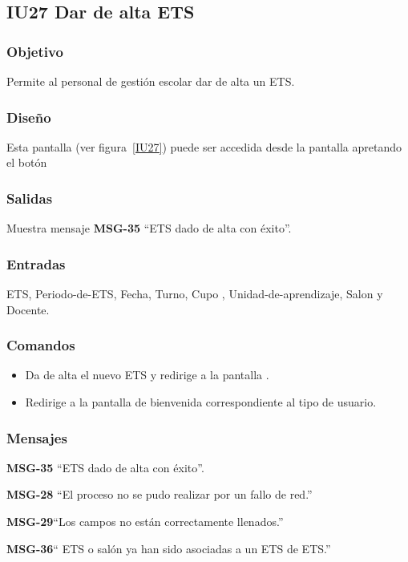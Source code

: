 
\subsection{IU27 Dar de alta ETS}
\subsubsection{Objetivo}
    Permite al personal de gestión escolar dar de alta un ETS.
\subsubsection{Diseño}
    Esta pantalla  (ver figura~\ref{IU27}) puede ser accedida desde la pantalla  apretando el botón 

\subsubsection{Salidas}
Muestra mensaje {\bf MSG-35} ``ETS  dado de alta con éxito''.
\subsubsection{Entradas}
ETS, Periodo-de-ETS, Fecha, Turno, Cupo , Unidad-de-aprendizaje,  Salon y Docente.
\subsubsection{Comandos}
\begin{itemize}
    \item {} Da de alta el nuevo ETS y redirige a la pantalla .
    \item {} Redirige a la pantalla de bienvenida correspondiente al tipo de usuario.
    
\end{itemize}

\subsubsection{Mensajes}

\begin{Citemize}
    \item {\bf MSG-35} ``ETS  dado de alta con éxito''.
    \item {\bf MSG-28}  ``El proceso no se pudo realizar por un fallo de red.''
    \item {\bf MSG-29}{``Los campos no están correctamente llenados.''}
    \item {\bf MSG-36}{`` ETS o salón  ya han sido asociadas a un ETS de ETS.''}
    
\end{Citemize}

